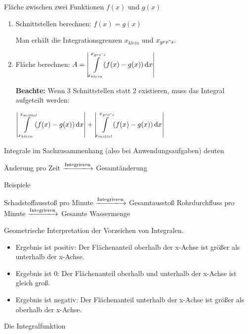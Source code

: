 \documentclass[paper=a6,landscape,ngerman,twoside=true,fontsize=12pt]{scrartcl}
\begin{document}
\begin{frage}
	Fläche zwischen zwei Funktionen $f(x)$ und $g(x)$
\end{frage}
\begin{antwort}
		\begin{enumerate} 
			\item Schnittstellen berechnen: $f(x)=g(x)$
			
			Man erhält die Integrationsgrenzen $x_{klein}$ und $x_{gro{"s}}$.
			\item Fläche berechnen: 
				$A=\left\vert\displaystyle\int\limits_{x_{klein}}^{x_{gro{"s}}} \! (f(x)-g(x)) \, \mathrm{d}x\right\vert$
			
			\textbf{Beachte:} \Large Wenn 3 Schnittstellen statt 2 existieren, muss das Integral aufgeteilt werden:
			
				$\left\vert\displaystyle\int\limits_{x_{klein}}^{x_{mittel}} \! (f(x)-g(x)) \, \mathrm{d}x\right\vert+\left\vert\displaystyle\int\limits_{x_{mittel}}^{x_{gro{"s}}} \! (f(x)-g(x)) \, \mathrm{d}x\right\vert$
		\end{enumerate} 
\end{antwort}
\begin{frage}
	Integrale im Sachzusammenhang (also bei Anwendungsaufgaben) deuten
\end{frage}
\begin{antwort}
	Änderung pro Zeit $\xlongrightarrow{\text{Integrieren}}$ Gesamtänderung 
	
	\bigskip Beispiele
	
	\large\bigskip
	Schadstoffausstoß pro Minute $\xlongrightarrow{\text{Integrieren}}$ Gesamtausstoß
	Rohrdurchfluss pro Minute $\xlongrightarrow{\text{Integrieren}}$ Gesamte Wassermenge
\end{antwort}
\begin{frage}
	Geometrische Interpretation der Vorzeichen von Integralen.
\end{frage}
\begin{antwort}
	\begin{itemize} 
		\item Ergebnis ist positiv: Der Flächenanteil oberhalb der x-Achse ist größer als unterhalb der x-Achse.
		\item Ergebnis ist 0: Der Flächenanteil oberhalb und unterhalb der x-Achse ist gleich groß.
		\item Ergebnis ist negativ: Der Flächenanteil unterhalb der x-Achse ist größer als oberhalb der x-Achse.
	\end{itemize}
\end{antwort}
\begin{frage}
	Die Integralfunktion
\end{frage}
\end{document}
